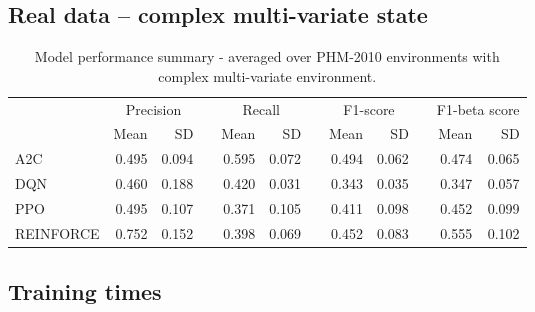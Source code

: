 \documentclass[a4paper, 12pt]{article}
\newcommand{\rowspace}[1]{\renewcommand{\arraystretch}{#1}}
\begin{document}
\subsection{Real data -- complex multi-variate state}
\begin{table}[hbt!]\centering
	\sffamily
	\rowspace{1.3}
	\begin{tabular}{@{}l rr c rr c rr c rr@{}}
		\arrayrulecolor{black!40}\toprule
		& \multicolumn{2}{c}{Precision} & \phantom{i} & \multicolumn{2}{c}{Recall} & \phantom{i} & \multicolumn{2}{c}{F1-score} & \phantom{i} & \multicolumn{2}{c}{F1-beta score} \\
		\cmidrule{2-3} \cmidrule{5-6} \cmidrule{8-9} \cmidrule{11-12} 
		
		&Mean &SD & &Mean &SD & &Mean &SD& &Mean & SD\\ \midrule
		A2C & 0.495 & 0.094 & &0.595 & 0.072 & & 0.494 & 0.062 & &0.474 &0.065 \\
		DQN & 0.460 & 0.188 & &0.420 & 0.031 & & 0.343 & 0.035 & &0.347 &0.057 \\
		PPO & 0.495 & 0.107 & &0.371 & 0.105 & & 0.411 & 0.098 & &0.452 &0.099 \\
		REINFORCE & 0.752 & 0.152 & &0.398 & 0.069 & & 0.452 & 0.083 & &0.555 &0.102 \\
		
		\bottomrule
	\end{tabular}
	\caption{Model performance summary - averaged over PHM-2010 environments with complex multi-variate environment.}
	\label{tbl:PHMMS}
\end{table}

\subsection{Training times}
\end{document}
